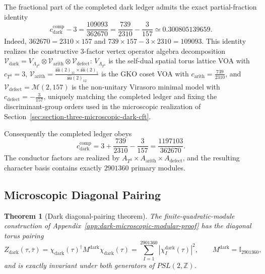 \documentclass[11pt,letterpaper]{article}
\theoremstyle{plain}
\newtheorem{theorem}{Theorem}
\newcommand{\cdarkcomp}{c_{\text{dark}}^{\text{comp}}}
\begin{document}
The fractional part of the completed dark ledger admits the exact
partial-fraction identity
\begin{equation}
\label{eq:dark-fractional-ledger}
 \cdarkcomp-3
 =\frac{109093}{362670}
 =\frac{739}{2310}-\frac{3}{157}
 \simeq0.300805139659.
\end{equation}
Indeed, \(362670=2310\times157\) and
\(739\times157-3\times2310=109093\). This identity realizes the
constructive 3-factor vertex operator algebra decomposition
$\mathcal{V}_{\text{dark}} = V_{\Lambda_{T^3}} \otimes \mathcal{V}_{\text{arith}} \otimes \mathcal{V}_{\text{defect}}$:
$V_{\Lambda_{T^3}}$ is the self-dual spatial torus lattice VOA with $c_{T^3} = 3$,
$\mathcal{V}_{\text{arith}} = \frac{\widehat{\mathfrak{su}}(2)_{11} \times \widehat{\mathfrak{su}}(2)_1}{\widehat{\mathfrak{su}}(2)_{12}}$
is the GKO coset VOA with $c_{\text{arith}} = \frac{739}{2310}$, and
$\mathcal{V}_{\text{defect}} = \mathcal{M}(2, 157)$ is the non-unitary Virasoro
minimal model with $c_{\text{defect}} = -\frac{3}{157}$, uniquely matching the
completed ledger and fixing the discriminant-group orders used in the
microscopic realization of Section~\ref{sec:section-three-microscopic-dark-cft}.

Consequently the completed ledger obeys
\begin{equation}
\label{eq:dark-completed-partial-fraction}
 \cdarkcomp=3+\frac{739}{2310}-\frac{3}{157}
 =\frac{1197103}{362670}.
\end{equation}
The conductor factors are realized by
$A_{T^3}\times A_{\text{arith}}\times A_{\text{defect}}$, and the resulting
character basis contains exactly $2901360$ primary modules.

\subsection{Microscopic Diagonal Pairing}

\begin{theorem}[Dark diagonal-pairing theorem]
The finite-quadratic-module construction of
Appendix~\ref{app:dark-microscopic-modular-proof} has the diagonal torus
pairing
\begin{equation}
\label{eq:dark-diagonal-partition-criterion}
 Z_{\text{dark}}(\tau,\bar\tau)
 =\chi_{\text{dark}}(\tau)^\dagger
 M^{\text{dark}}\chi_{\text{dark}}(\tau)
 =\sum_{I=1}^{2901360}|\chi_I^{\text{dark}}(\tau)|^2,
 \qquad
 M^{\text{dark}}=\mathbb I_{2901360},
\end{equation}
and is exactly invariant under both generators of $PSL(2,\mathbb Z)$.
\end{theorem}
\end{document}
